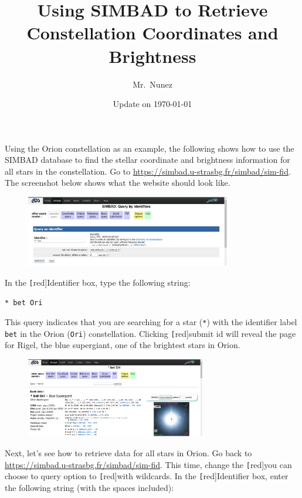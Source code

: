 \documentclass{article}
\title{Using SIMBAD to Retrieve Constellation Coordinates and Brightness}
\author{Mr.~Nunez}
\date{Update on \today}
\begin{document}
\maketitle

Using the Orion constellation as an example, the following shows how to use the SIMBAD database to find the stellar coordinate and brightness information for all stars in the constellation. Go to \href{https://simbad.u-strasbg.fr/simbad/sim-fid}{https://simbad.u-strasbg.fr/simbad/sim-fid}. The screenshot below shows what the website should look like.

\begin{figure}[h!]
    \centering
    \includegraphics[width=0.8\textwidth]{Figures/SIMBAD.png}
\end{figure}

In the \texttt[red]{Identifier} box, type the following string:

\begin{center}
    \texttt{* bet Ori}
\end{center}

This query indicates that you are searching for a star (\texttt{*}) with the identifier label \texttt{bet} in the Orion (\texttt{Ori}) constellation. Clicking \texttt[red]{submit id} will reveal the page for Rigel, the blue supergiant, one of the brightest stars in Orion.

\begin{figure}[h!]
    \centering
    \includegraphics[width=0.7\textwidth]{Figures/Rigel.png}
\end{figure}

Next, let's see how to retrieve data for all stars in Orion. Go back to \href{https://simbad.u-strasbg.fr/simbad/sim-fid}{https://simbad.u-strasbg.fr/simbad/sim-fid}. This time, change the \texttt[red]{you can choose to query} option to \texttt[red]{with wildcards}. In the \texttt[red]{Identifier} box, enter the following string (with the spaces included): 
\end{document}
